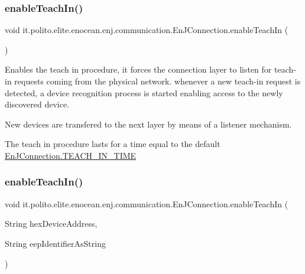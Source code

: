 \subsubsection{\texorpdfstring{enable\+Teach\+In()}{enableTeachIn()}\hspace{0.1cm}{\footnotesize\ttfamily [1/4]}}
{\footnotesize\ttfamily void it.\+polito.\+elite.\+enocean.\+enj.\+communication.\+En\+J\+Connection.\+enable\+Teach\+In (\begin{DoxyParamCaption}{ }\end{DoxyParamCaption})}

Enables the teach in procedure, it forces the connection layer to listen for teach-\/in requests coming from the physical network. whenever a new teach-\/in request is detected, a device recognition process is started enabling access to the newly discovered device. 

New devices are transfered to the next layer by means of a listener mechanism. 

The teach in procedure lasts for a time equal to the default {\ttfamily \hyperlink{classit_1_1polito_1_1elite_1_1enocean_1_1enj_1_1communication_1_1_en_j_connection_a1584089c4459a927b1cd99c8d2249773}{En\+J\+Connection.\+T\+E\+A\+C\+H\+\_\+\+I\+N\+\_\+\+T\+I\+ME}} \hypertarget{classit_1_1polito_1_1elite_1_1enocean_1_1enj_1_1communication_1_1_en_j_connection_af3248db04c2dfd43b068b10513f32e8b}{}\label{classit_1_1polito_1_1elite_1_1enocean_1_1enj_1_1communication_1_1_en_j_connection_af3248db04c2dfd43b068b10513f32e8b} 
\subsubsection{\texorpdfstring{enable\+Teach\+In()}{enableTeachIn()}\hspace{0.1cm}{\footnotesize\ttfamily [2/4]}}
{\footnotesize\ttfamily void it.\+polito.\+elite.\+enocean.\+enj.\+communication.\+En\+J\+Connection.\+enable\+Teach\+In (\begin{DoxyParamCaption}\item[{String}]{hex\+Device\+Address,  }\item[{String}]{eep\+Identifier\+As\+String }\end{DoxyParamCaption})}

